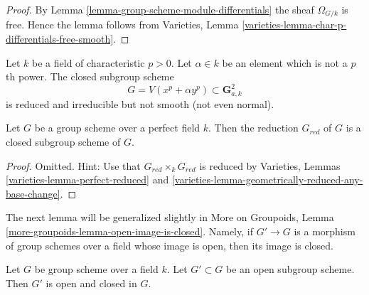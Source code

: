 \begin{proof}
By
Lemma \ref{lemma-group-scheme-module-differentials}
the sheaf $\Omega_{G/k}$ is free. Hence the lemma follows from
Varieties, Lemma \ref{varieties-lemma-char-p-differentials-free-smooth}.
\end{proof}

\begin{remark}
\label{remark-reduced-smooth-not-true-general}
Let $k$ be a field of characteristic $p > 0$.
Let $\alpha \in k$ be an element which is not a $p$th power.
The closed subgroup scheme
$$
G = V(x^p + \alpha y^p) \subset \mathbf{G}_{a, k}^2
$$
is reduced and irreducible but not smooth (not even normal).
\end{remark}

\begin{lemma}
\label{lemma-reduced-subgroup-scheme-perfect}
Let $G$ be a group scheme over a perfect field $k$.
Then the reduction $G_{red}$ of $G$ is a closed subgroup scheme of $G$.
\end{lemma}

\begin{proof}
Omitted. Hint: Use that $G_{red} \times_k G_{red}$ is reduced by
Varieties, Lemmas \ref{varieties-lemma-perfect-reduced} and
\ref{varieties-lemma-geometrically-reduced-any-base-change}.
\end{proof}

\noindent
The next lemma will be generalized slightly in
More on Groupoids, Lemma
\ref{more-groupoids-lemma-open-image-is-closed}.
Namely, if $G' \to G$ is a morphism of group schemes over a field
whose image is open, then its image is closed.

\begin{lemma}
\label{lemma-open-subgroup-closed-over-field}
Let $G$ be group scheme over a field $k$.
Let $G' \subset G$ be an open subgroup scheme.
Then $G'$ is open and closed in $G$.
\end{lemma}

